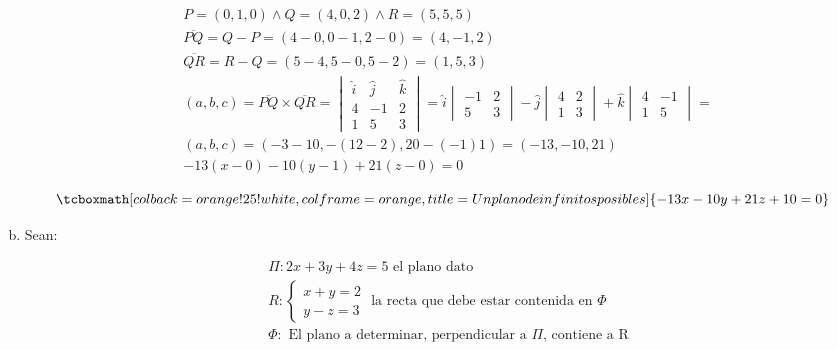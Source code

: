 \documentclass{article}
\begin{document}
\begin{enumerate}[a)]
\begin{subequations}
\begin{align}
& P = (0, 1, 0) \wedge Q = (4, 0, 2) \wedge R = (5, 5, 5) \\
& \overline{PQ} = Q - P = (4-0, 0-1, 2-0) = (4, -1, 2) \\
& \overline{QR} = R - Q = (5-4, 5-0, 5-2) = (1, 5, 3) \\
& (a, b, c) = \overline{PQ} \times \overline{QR} = \begin{vmatrix}
\hat{i} & \hat{j} & \hat{k} \\
4 & -1 & 2 \\
1 & 5 & 3
\end{vmatrix} = \hat{i} \begin{vmatrix}
-1 & 2 \\
5 & 3
\end{vmatrix} -\hat{j} \begin{vmatrix}
4 & 2 \\
1 & 3
\end{vmatrix} +\hat{k} \begin{vmatrix}
4 & -1 \\
1 & 5
\end{vmatrix} = \\
& (a, b, c) = (-3-10, -(12-2), 20-(-1)1) = (-13, -10, 21) \\
& -13 (x-0) -10 (y-1) +21 (z-0) = 0
\end{align}
\end{subequations}

\begin{equation}
\tcboxmath[colback=orange!25!white,colframe=orange, title=Un plano de infinitos posibles]
{ -13x - 10y + 21z + 10 = 0 }
\end{equation}

\item Sean:

\begin{subequations}
\begin{align}
& \Pi: 2x + 3y + 4z = 5 \text{ el plano dato} \\
& R: \left\{ \begin{array}{ll}
x + y = 2 \\
y - z = 3
\end{array} \right. \text{ la recta que debe estar contenida en } \Phi \\
& \Phi: \text{ El plano a determinar, perpendicular a } \Pi \text{, contiene a R}
\end{align}
\end{subequations}


\end{enumerate}
\end{document}
